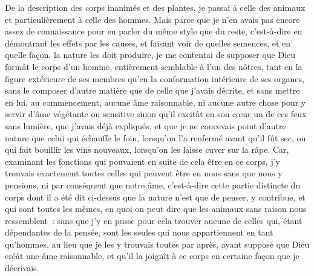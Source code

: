 \documentclass[french,twoside]{book} %
\begin{document}
De la description des corps inanimés et des plantes, je passai à celle des animaux et particulièrement à celle des hommes. Mais parce que je n'en avais pas encore assez de connaissance pour en parler du même style que du reste, c'est-à-dire en démontrant les effets par les causes, et faisant voir de quelles semences, et en quelle façon, la nature les doit produire, je me contentai de supposer que Dieu formât le corps d'un homme, entièrement semblable à l'un des nôtres, tant en la figure extérieure de ses membres qu'en la conformation intérieure de ses organes, sans le composer d'autre matière que de celle que j'avais décrite, et sans mettre en lui, au commencement, aucune âme raisonnable, ni aucune autre chose pour y servir d'âme végétante ou sensitive sinon qu'il excitât en son cœur un de ces feux sans lumière, que j'avais déjà expliqués, et que je ne concevais point d'autre nature que celui qui échauffe le foin, lorsqu'on l'a renfermé avant qu'il fût sec, ou qui fait bouillir les vins nouveaux, lorsqu'on les laisse cuver sur la râpe. Car, examinant les fonctions qui pouvaient en suite de cela être en ce corps, j'y trouvais exactement toutes celles qui peuvent être en nous sans que nous y pensions, ni par conséquent que notre âme, c'est-à-dire cette partie distincte du corps dont il a été dit ci-dessus que la nature n'est que de penser, y contribue, et qui sont toutes les mêmes, en quoi on peut dire que les animaux sans raison nous ressemblent : sans que j'y en pusse pour cela trouver aucune de celles qui, étant dépendantes de la pensée, sont les seules qui nous appartiennent en tant qu'hommes, au lieu que je les y trouvais toutes par après, ayant supposé que Dieu créât une âme raisonnable, et qu'il la joignît à ce corps en certaine façon que je décrivais.\par
\end{document}
